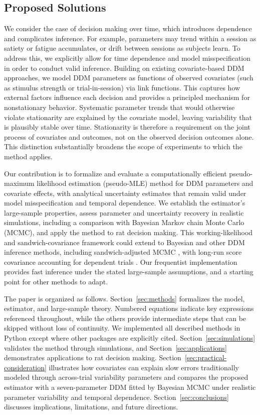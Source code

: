 \documentclass[00-main.tex]{subfiles}
\begin{document}
\subsection{Proposed Solutions}
We consider the case of decision making over time, which introduces dependence and complicates inference. For example, parameters may trend within a session as satiety or fatigue accumulates, or drift between sessions as subjects learn. To address this, we explicitly allow for time dependence and model misspecification in order to conduct valid inference. Building on existing covariate-based DDM approaches, we model DDM parameters as functions of observed covariates (such as stimulus strength or trial-in-session) via link functions. This captures how external factors influence each decision and provides a principled mechanism for nonstationary behavior. Systematic parameter trends that would otherwise violate stationarity are explained by the covariate model, leaving variability that is plausibly stable over time. Stationarity is therefore a requirement on the joint process of covariates and outcomes, not on the observed decision outcomes alone. This distinction substantially broadens the scope of experiments to which the method applies.

Our contribution is to formalize and evaluate a computationally efficient pseudo-maximum likelihood estimation (pseudo-MLE) method for DDM parameters and covariate effects, with analytical uncertainty estimates that remain valid under model misspecification and temporal dependence. We establish the estimator's large-sample properties, assess parameter and uncertainty recovery in realistic simulations, including a comparison with Bayesian Markov chain Monte Carlo (MCMC), and apply the method to rat decision making. This working-likelihood and sandwich-covariance framework could extend to Bayesian and other DDM inference methods, including sandwich-adjusted MCMC \citep{shaby_open-faced_2014}, with long-run score covariance accounting for dependent trials \citep{newey_simple_1987}. Our frequentist implementation provides fast inference under the stated large-sample assumptions, and a starting point for other methods to adapt.

The paper is organized as follows. Section~\ref{sec:methods} formalizes the model, estimator, and large-sample theory. Numbered equations indicate key expressions referenced throughout, while the others provide intermediate steps that can be skipped without loss of continuity. We implemented all described methods in Python except where other packages are explicitly cited. Section~\ref{sec:simulations} validates the method through simulations, and Section~\ref{sec:applications} demonstrates applications to rat decision making. Section~\ref{sec:practical-consideration} illustrates how covariates can explain slow errors traditionally modeled through across-trial variability parameters and compares the proposed estimator with a seven-parameter DDM fitted by Bayesian MCMC under realistic parameter variability and temporal dependence. Section~\ref{sec:conclusions} discusses implications, limitations, and future directions.
\end{document}
